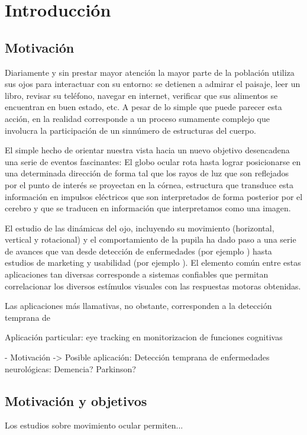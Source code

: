 \documentclass[../main.tex]{subfiles}
\begin{document}
		
\chapter{Introducción}
\label{cha:01_introducción}
	\section{Motivación}
	\label{sec:01_motivacion}

		Diariamente y sin prestar mayor atención la mayor parte de la población utiliza sus ojos para interactuar con su entorno: se detienen a admirar el paisaje, leer un libro, revisar su teléfono, navegar en internet, verificar que sus alimentos se encuentran en buen estado, etc. A pesar de lo simple que puede parecer esta acción, en la realidad corresponde a un proceso sumamente complejo que involucra la participación de un sinnúmero de estructuras del cuerpo. 

		El simple hecho de orientar nuestra vista hacia un nuevo objetivo desencadena una serie de eventos fascinantes: El globo ocular rota hasta lograr posicionarse en una determinada dirección de forma tal que los rayos de luz que son reflejados por el punto de interés se proyectan en la córnea, estructura que transduce esta información en impulsos eléctricos que son interpretados de forma posterior por el cerebro y que se traducen en información que interpretamos como una imagen. 

		El estudio de las dinámicas del ojo, incluyendo su movimiento (horizontal, vertical y rotacional) y el comportamiento de la pupila ha dado paso a una serie de avances que van desde detección de enfermedades (por ejemplo \cite{}) hasta estudios de marketing y usabilidad (por ejemplo \cite{}). El elemento común entre estas aplicaciones tan diversas corresponde a sistemas confiables que permitan correlacionar los diversos estímulos visuales con las respuestas motoras obtenidas.

		Las aplicaciones más llamativas, no obstante, corresponden a la detección temprana de  


		Aplicación particular: eye tracking en monitorizacion de funciones cognitivas

		- Motivación -> Posible aplicación: Detección temprana de enfermedades neurológicas: Demencia? Parkinson?  


	\section{Motivación y objetivos}
	\label{sec:01_motivacón_y_objetivos}
		Los estudios sobre movimiento ocular permiten...
\end{document}
